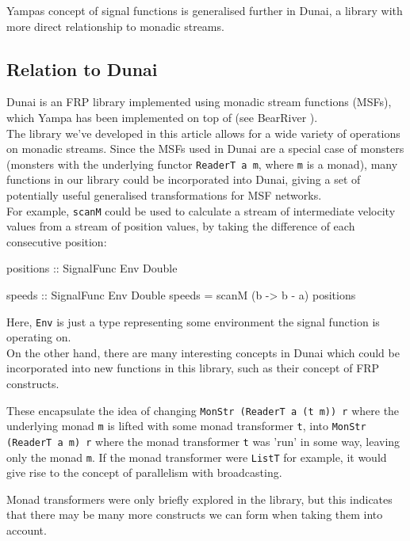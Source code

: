 Yampas concept of signal functions is generalised further in Dunai, a library with more direct relationship to monadic streams.

\subsection{Relation to Dunai}

Dunai \cite{frp_refactored}\cite{dunai} is an FRP library implemented using monadic stream functions (MSFs), which Yampa has been implemented on top of (see BearRiver \cite{bearriver}). \\

The library we've developed in this article allows for a wide variety of operations on monadic streams. Since the MSFs used in Dunai are a special case of monsters (monsters with the underlying functor \verb+ReaderT a m+, where \verb+m+ is a monad), many functions in our library could be incorporated into Dunai, giving a set of potentially useful generalised transformations for MSF networks. \\

For example, \verb+scanM+ could be used to calculate a stream of intermediate velocity values from a stream of position values, by taking the difference of each consecutive position:
\begin{haskell}
positions :: SignalFunc Env Double 

speeds :: SignalFunc Env Double 
speeds = scanM (\a b -> b - a) positions
\end{haskell}

Here, \verb+Env+ is just a type representing some environment the signal function is operating on. \\

On the other hand, there are many interesting concepts in Dunai which could be incorporated into new functions in this library, such as their concept of FRP constructs. 

These encapsulate the idea of changing \verb+MonStr (ReaderT a (t m)) r+ where the underlying monad \verb+m+ is lifted with some monad transformer \verb+t+, into \verb+MonStr (ReaderT a m) r+ where the monad transformer \verb+t+ was 'run' in some way, leaving only the monad \verb+m+. If the monad transformer were \verb+ListT+ for example, it would give rise to the concept of parallelism with broadcasting. 

Monad transformers were only briefly explored in the library, but this indicates that there may be many more constructs we can form when taking them into account. \\

